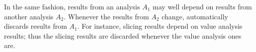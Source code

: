 In the same fashion, results from an analysis $A_1$ may well depend on results from another
analysis $A_2$. Whenever the results from $A_2$ change, \FramaC automatically discards
results from $A_1$. For instance, slicing results depend on value analysis
results; thus the slicing results are discarded whenever the value analysis
ones are.
